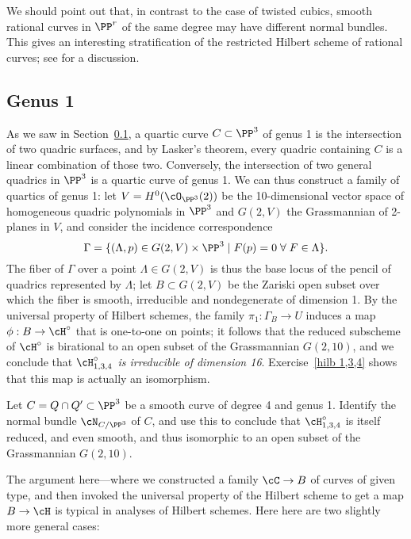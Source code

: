 We should point out that, in contrast to the case of twisted cubics, smooth rational curves in $\PP^r$ of the same degree may have different normal bundles. This gives an interesting stratification of the restricted Hilbert scheme of rational curves; see \cite{Riedl} for a discussion.

\subsection{Genus 1}
 As we saw in Section~\ref{}, a quartic curve $C \subset \PP^3$ of genus 1 is the intersection of two quadric surfaces, and by Lasker's theorem, every quadric containing $C$ is a linear combination of those two. Conversely, the intersection of two general quadrics in $\PP^3$ is a quartic curve of genus 1. We can thus construct a family of quartics of genus 1: let $V = H^0(\cO_{\PP^3}(2))$ be the 10-dimensional vector space of homogeneous quadric polynomials in $\PP^3$ and $G(2,V)$ the Grassmannian of 2-planes in $V$, and consider the incidence correspondence
$$
\Gamma = \{ (\Lambda, p) \in G(2,V) \times \PP^3 \mid F(p)=0 \; \forall \; F \in \Lambda \}.
$$
The fiber of $\Gamma$ over a point $\Lambda \in G(2,V)$ is thus the base locus of the pencil of quadrics represented by $\Lambda$; let $B \subset G(2,V)$ be the Zariski open subset over which the fiber is smooth, irreducible and nondegenerate of dimension 1. By the universal property of Hilbert schemes, the family $\pi_1 : \Gamma_B \to U$ induces a map $\phi : B \to \cH^\circ$ that is one-to-one on points; it follows that the reduced subscheme of $\cH^\circ$ is birational to an open subset of the Grassmannian $G(2,10)$, and we conclude that \emph{$\cH^\circ_{1,3,4}$ is irreducible of dimension 16}. Exercise~\ref{hilb 1,3,4} shows that this map is actually an isomorphism.

\begin{exercise}\label{hilb 1,3,4}
Let $C = Q \cap Q' \subset \PP^3$ be a smooth curve of degree 4 and genus 1. Identify the normal bundle $\cN_{C/\PP^3}$ of $C$, and use this to conclude that $\cH^\circ_{1,3,4}$ is itself reduced, and even smooth, and thus isomorphic to an open subset of the Grassmannian $G(2,10)$.
\end{exercise}

The  argument  here---where we constructed a family $\cC \to B$ of curves of given type, and then invoked the universal property of the Hilbert scheme to get a map $B \to \cH$ is typical in analyses of Hilbert schemes. Here here are two slightly more general cases:

